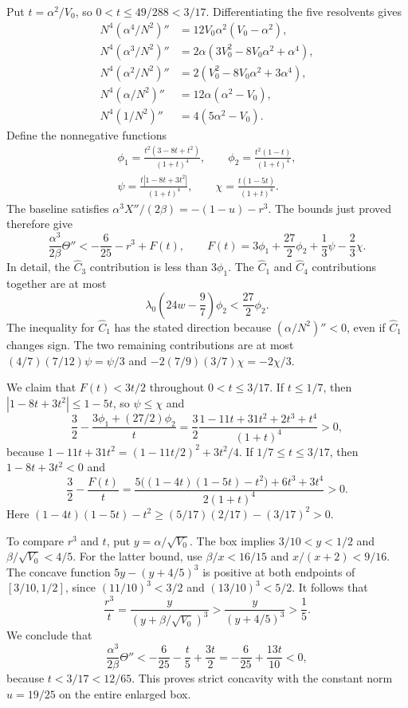 Put $t=\alpha^2/V_0$, so $0<t\le49/288<3/17$. Differentiating the five resolvents gives
\begin{align*}
 N^4(\alpha^4/N^2)''&=12V_0\alpha^2(V_0-\alpha^2),\\
 N^4(\alpha^3/N^2)''&=2\alpha(3V_0^2-8V_0\alpha^2+\alpha^4),\\
 N^4(\alpha^2/N^2)''&=2(V_0^2-8V_0\alpha^2+3\alpha^4),\\
 N^4(\alpha/N^2)''&=12\alpha(\alpha^2-V_0),\\
 N^4(1/N^2)''&=4(5\alpha^2-V_0).
\end{align*}
Define the nonnegative functions
\begin{gather*}
 \phi_1=\frac{t^2(3-8t+t^2)}{(1+t)^4},\qquad
 \phi_2=\frac{t^2(1-t)}{(1+t)^4},\\
 \psi=\frac{t|1-8t+3t^2|}{(1+t)^4},\qquad
 \chi=\frac{t(1-5t)}{(1+t)^4}.
\end{gather*}
The baseline satisfies $\alpha^3X''/(2\beta)=-(1-u)-r^3$.
The bounds just proved therefore give
\[
 \frac{\alpha^3}{2\beta}\Theta''
 <-\frac6{25}-r^3+F(t),\qquad
 F(t)=3\phi_1+\frac{27}{2}\phi_2+\frac13\psi-\frac23\chi.
\]
In detail, the $\widehat C_3$ contribution is less than $3\phi_1$.
The $\widehat C_1$ and $\widehat C_4$ contributions together are at most
\[
 \lambda_0\left(24w-\frac97\right)\phi_2<\frac{27}{2}\phi_2.
\]
The inequality for $\widehat C_1$ has the stated direction because
$(\alpha/N^2)''<0$, even if $\widehat C_1$ changes sign.
The two remaining contributions are at most
$(4/7)(7/12)\psi=\psi/3$ and $-2(7/9)(3/7)\chi=-2\chi/3$.

We claim that $F(t)<3t/2$ throughout $0<t\le3/17$.
If $t\le1/7$, then $|1-8t+3t^2|\le1-5t$, so $\psi\le\chi$ and
\[
 \frac32-\frac{3\phi_1+(27/2)\phi_2}{t}
 =\frac32\frac{1-11t+31t^2+2t^3+t^4}{(1+t)^4}>0,
\]
because $1-11t+31t^2=(1-11t/2)^2+3t^2/4$.
If $1/7\le t\le3/17$, then $1-8t+3t^2<0$ and
\[
 \frac32-\frac{F(t)}t
 =\frac{5\bigl((1-4t)(1-5t)-t^2\bigr)+6t^3+3t^4}{2(1+t)^4}>0.
\]
Here $(1-4t)(1-5t)-t^2\ge(5/17)(2/17)-(3/17)^2>0$.

To compare $r^3$ and $t$, put $y=\alpha/\sqrt{V_0}$.
The box implies $3/10<y<1/2$ and $\beta/\sqrt{V_0}<4/5$.
For the latter bound, use $\beta/x<16/15$ and $x/(x+2)<9/16$.
The concave function $5y-(y+4/5)^3$ is positive at both endpoints of
$[3/10,1/2]$, since $(11/10)^3<3/2$ and $(13/10)^3<5/2$.
It follows that
\[
 \frac{r^3}{t}
 =\frac{y}{(y+\beta/\sqrt{V_0})^3}
 >\frac{y}{(y+4/5)^3}>\frac15.
\]
We conclude that
\[
 \frac{\alpha^3}{2\beta}\Theta''
 <-\frac6{25}-\frac t5+\frac{3t}{2}
 =-\frac6{25}+\frac{13t}{10}<0,
\]
because $t<3/17<12/65$. This proves strict concavity with the constant norm
$u=19/25$ on the entire enlarged box.

